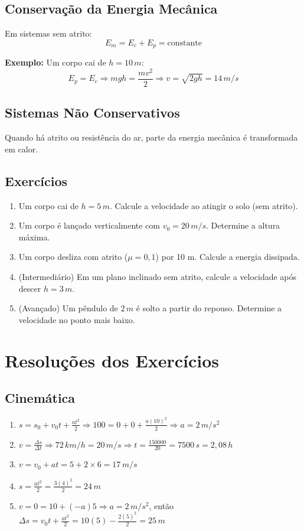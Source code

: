\documentclass[12pt,a4paper]{article}
\begin{document}
\subsection{Conservação da Energia Mecânica}
Em sistemas sem atrito:
\[
E_m = E_c + E_p = \text{constante}
\]

\textbf{Exemplo:} Um corpo cai de $h=10\,m$:
\[
E_p = E_c \Rightarrow mgh = \frac{mv^2}{2} \Rightarrow v = \sqrt{2gh} = 14\,m/s
\]

\subsection{Sistemas Não Conservativos}
Quando há atrito ou resistência do ar, parte da energia mecânica é transformada em calor.

\subsection{Exercícios}
\begin{enumerate}
\item Um corpo cai de $h=5\,m$. Calcule a velocidade ao atingir o solo (sem atrito).
\item Um corpo é lançado verticalmente com $v_0=20\,m/s$. Determine a altura máxima.
\item Um corpo desliza com atrito ($\mu=0{,}1$) por 10 m. Calcule a energia dissipada.
\item (Intermediário) Em um plano inclinado sem atrito, calcule a velocidade após descer $h=3\,m$.
\item (Avançado) Um pêndulo de $2\,m$ é solto a partir do repouso. Determine a velocidade no ponto mais baixo.
\end{enumerate}

\newpage
\section{Resoluções dos Exercícios}

\subsection{Cinemática}
\begin{enumerate}
\item $s = s_0 + v_0t + \frac{at^2}{2} \Rightarrow 100 = 0 + 0 + \frac{a(10)^2}{2} \Rightarrow a = 2\,m/s^2$
\item $v = \frac{\Delta s}{\Delta t} \Rightarrow 72\,km/h = 20\,m/s \Rightarrow t = \frac{150000}{20} = 7500\,s = 2{,}08\,h$
\item $v = v_0 + at = 5 + 2 \times 6 = 17\,m/s$
\item $s = \frac{at^2}{2} = \frac{3(4)^2}{2} = 24\,m$
\item $v = 0 = 10 + (-a)5 \Rightarrow a=2\,m/s^2$, então $\Delta s = v_0t + \frac{at^2}{2} = 10(5) - \frac{2(5)^2}{2}=25\,m$
\end{enumerate}
\end{document}
